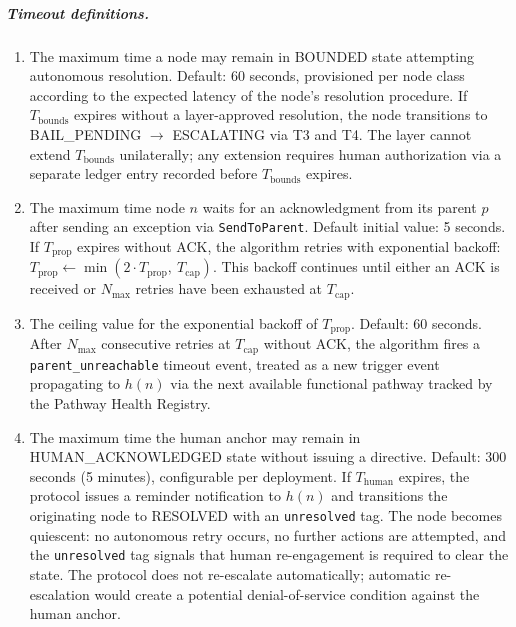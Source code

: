 \subparagraph{Timeout definitions.}

\begin{enumerate}
\item[\textbf{$T_{\text{bounds}}$ — Bounds Engine resolution timeout.}] The maximum time a node may remain in BOUNDED state attempting autonomous resolution. Default: 60 seconds, provisioned per node class according to the expected latency of the node's resolution procedure. If $T_{\text{bounds}}$ expires without a \fact{} layer-approved resolution, the node transitions to BAIL\_PENDING $\rightarrow$ ESCALATING via T3 and T4. The \fact{} layer cannot extend $T_{\text{bounds}}$ unilaterally; any extension requires human authorization via a separate ledger entry recorded before $T_{\text{bounds}}$ expires.

\item[\textbf{$T_{\text{prop}}$ — Per-hop propagation timeout.}] The maximum time node $n$ waits for an acknowledgment from its parent $p$ after sending an exception via \texttt{SendToParent}. Default initial value: 5 seconds. If $T_{\text{prop}}$ expires without ACK, the algorithm retries with exponential backoff: $T_{\text{prop}} \leftarrow \min(2 \cdot T_{\text{prop}},\ T_{\text{cap}})$. This backoff continues until either an ACK is received or $N_{\max}$ retries have been exhausted at $T_{\text{cap}}$.

\item[\textbf{$T_{\text{cap}}$ — Maximum propagation timeout value.}] The ceiling value for the exponential backoff of $T_{\text{prop}}$. Default: 60 seconds. After $N_{\max}$ consecutive retries at $T_{\text{cap}}$ without ACK, the algorithm fires a \texttt{parent\_unreachable} timeout event, treated as a new trigger event propagating to $h(n)$ via the next available functional pathway tracked by the Pathway Health Registry.

\item[\textbf{$T_{\text{human}}$ — Human acknowledgment timeout.}] The maximum time the human anchor may remain in HUMAN\_ACKNOWLEDGED state without issuing a directive. Default: 300 seconds (5 minutes), configurable per deployment. If $T_{\text{human}}$ expires, the protocol issues a reminder notification to $h(n)$ and transitions the originating node to RESOLVED with an \texttt{unresolved} tag. The node becomes quiescent: no autonomous retry occurs, no further actions are attempted, and the \texttt{unresolved} tag signals that human re-engagement is required to clear the state. The protocol does not re-escalate automatically; automatic re-escalation would create a potential denial-of-service condition against the human anchor.
\end{enumerate}

